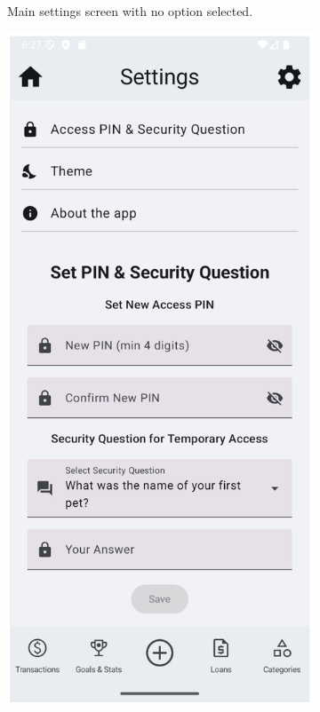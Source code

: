 \documentclass[a4paper,12pt]{article}
\begin{document}
\begin{figure}[H]
\begin{subfigure}[b]{0.23\textwidth}
        \caption{Main settings screen with no option selected.}
        \label{fig:settings_main}
    \end{subfigure}
    \hfill
    \begin{subfigure}[b]{0.23\textwidth}
        \includegraphics[width=\textwidth]{settings_pin.png}

\end{subfigure}
\end{figure}
\end{document}
